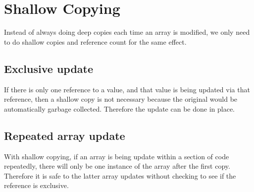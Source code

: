 %
%
%
%
\section{Shallow Copying}
Instead of always doing deep copies each time an array is modified, we only need to do shallow copies and reference count for the same effect.
\subsection{Exclusive update}
If there is only one reference to a value, and that value is being updated via that reference, then a shallow copy is not necessary because the original would be automatically garbage collected.
    Therefore the update can be done in place.
\subsection{Repeated array update}
With shallow copying, if an array is being update within a section of code repeatedly, there will only be one instance of the array after the first copy.
    Therefore it is safe to the latter array updates without checking to see if the reference is exclusive.

